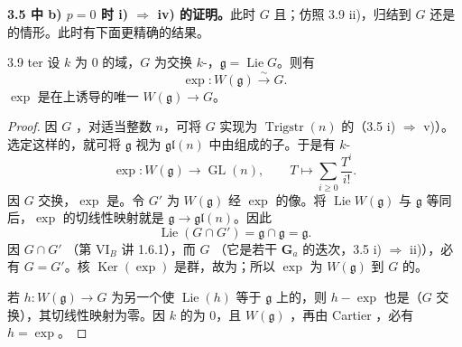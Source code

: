 \textbf{3.5 中 b) $p=0$ 时 i) $\Rightarrow$ iv) 的证明。}此时 $G$ 且；仿照 3.9 ii)，归结到 $G$ 还是的情形。此时有下面更精确的结果。
\begin{SGAresult}{}{3.9 ter}
设 $k$ 为 $0$ 的域，$G$ 为交换 $k$-，$\mathfrak g=\operatorname{Lie}G$。则有
\[\exp:W(\mathfrak g)\xrightarrow{\sim}G.\]
 $\exp$ 是在上诱导的唯一 $W(\mathfrak g)\to G$。
\end{SGAresult}
\begin{proof}
因 $G$ ，对适当整数 $n$，可将 $G$ 实现为 $\operatorname{Trigstr}(n)$ 的（3.5 i) $\Rightarrow$ v)）。选定这样的，就可将 $\mathfrak g$ 视为 $\mathfrak{gl}(n)$ 中由组成的子。于是有 $k$-
\[\exp:W(\mathfrak g)\longrightarrow\operatorname{GL}(n),\qquad T\longmapsto\sum_{i\geq0}\frac{T^i}{i!}.\]
因 $G$ 交换，$\exp$ 是。令 $G'$ 为 $W(\mathfrak g)$ 经 $\exp$ 的像。将 $\operatorname{Lie}W(\mathfrak g)$ 与 $\mathfrak g$ 等同后，$\exp$ 的切线性映射就是 $\mathfrak g\to\mathfrak{gl}(n)$。因此
\[\operatorname{Lie}(G\cap G')=\mathfrak g\cap\mathfrak g=\mathfrak g.\]
因 $G\cap G'$ （第 VI$_B$ 讲 1.6.1），而 $G$ （它是若干 $\mathbf G_a$ 的迭次，3.5 i) $\Rightarrow$ ii)），必有 $G=G'$。核 $\operatorname{Ker}(\exp)$ 是群，故为；所以 $\exp$ 为 $W(\mathfrak g)$ 到 $G$ 的。

若 $h:W(\mathfrak g)\to G$ 为另一个使 $\operatorname{Lie}(h)$ 等于 $\mathfrak g$ 上的，则 $h-\exp$ 也是（$G$ 交换），其切线性映射为零。因 $k$ 的为 $0$，且 $W(\mathfrak g)$ ，再由 Cartier ，必有 $h=\exp$。
\end{proof}
